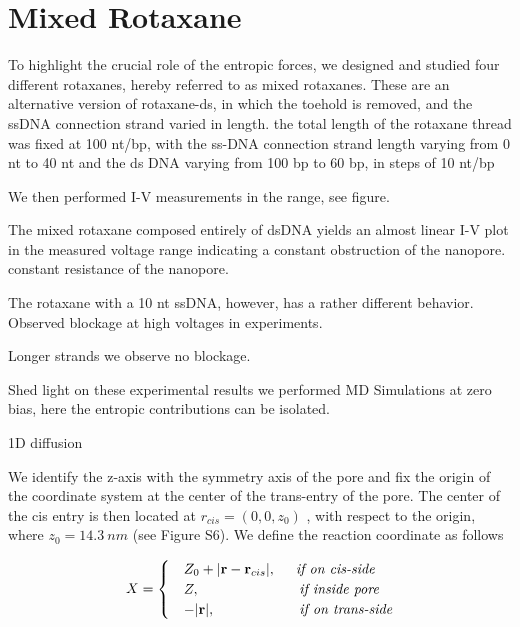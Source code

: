 \section{Mixed Rotaxane}

To highlight the crucial role of the entropic forces, we designed and studied four
different rotaxanes, hereby referred to as mixed rotaxanes. These are an alternative
version of rotaxane-ds, in which the toehold is removed, and the ssDNA connection strand
varied in length. the total length of the rotaxane thread was fixed at 100 nt/bp, with
the ss-DNA connection strand length varying from 0 nt to 40 nt and the ds DNA varying
from 100 bp to 60 bp, in steps of 10 nt/bp

We then performed I-V measurements in the range, see figure.

The mixed rotaxane composed entirely of dsDNA yields an almost linear I-V plot in the
measured voltage range indicating a constant obstruction of the nanopore. constant
resistance of the nanopore.

The rotaxane with a 10 nt ssDNA, however, has a rather different behavior. Observed
blockage at high voltages in experiments.

Longer strands we observe no blockage.

Shed light on these experimental results we performed MD Simulations at zero bias, here
the entropic contributions can be isolated.

1D diffusion

We identify the z-axis with the symmetry axis of the pore and fix the origin of the
coordinate system at the center of the trans-entry of the pore. The center of the cis
entry is then located at $r_{cis} = (0, 0, z_{0})$ , with respect to the origin,
where $z_0 = 14.3\ nm$ (see Figure S6). We define the reaction coordinate as follows

\begin{equation}
  X = \begin{cases}
        &Z_0 + |\textbf{r} - \textbf{r}_{cis}|, \hspace{0.5cm} \textit{if on cis-side}\\
        &Z, \hspace{2.5cm} \textit{if inside pore}\\
        &-|\textbf{r}|, \hspace{2.11cm} \textit{if on trans-side}
      \end{cases}
\end{equation}

